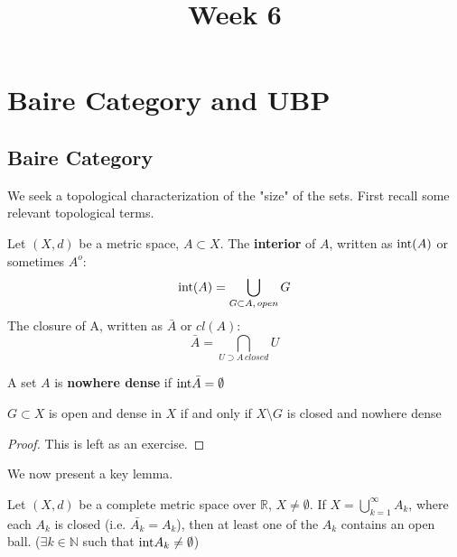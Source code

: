 \documentclass{article}
\title{Week 6}
\begin{document}
\maketitle

\section{Baire Category and UBP}

\subsection{Baire Category}

We seek a topological characterization of the "size" of the sets. First recall some relevant topological terms.  

\begin{definition}
    Let $(X,d)$ be a metric space, $A\subset X$.
    The \textbf{interior} of $A$, written as $\textrm{int}(A)$ or sometimes $A^o$:
    $$ \textrm{int}(A)=\bigcup_{G\subset A,\,open}G$$
    The closure of A, written as $\bar{A}$ or $cl(A)$:
    $$ \bar{A}=\bigcap_{U\supset A\,closed}U$$

\end{definition}  

\begin{definition}
    A set $A$ is \textbf{nowhere dense} if $\textrm{int}{\bar{A}}=\emptyset$
\end{definition}

\begin{proposition}
\label{complement of nowhere}
    $G \subset X$ is open and dense in $X$ if and only if $X \setminus G$ is closed and nowhere dense
\end{proposition}   

\begin{proof}
    This is left as an exercise.
\end{proof}


We now present a key lemma.   


\begin{lemma}%
\label{baire lemma}
    Let $(X,d)$ be a complete metric space over $\mathbb{R}$, $X\neq\emptyset$.    
    If $X=\bigcup_{k=1}^\infty A_k$, where each $A_k$ is closed (i.e. $\bar{A_k}=A_k$), then at least one of the $A_k$ contains an open ball. ($\exists k \in \mathbb{N}$ such that $\textrm{int}{A_k}\neq\emptyset$)  
\end{lemma}    
\end{document}
